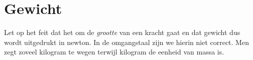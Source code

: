 \documentclass{ximera}
\begin{document}
	\author{Bart Lambregs}
    \xmsource



	\section{Gewicht}

	
	
	
	Let op het feit dat het om de \textit{grootte} van een kracht gaat en dat gewicht dus wordt uitgedrukt in newton. In de omgangstaal zijn we hierin niet correct. Men zegt zoveel kilogram te wegen terwijl kilogram de eenheid van massa is.
	
	
	
	
\end{document}
